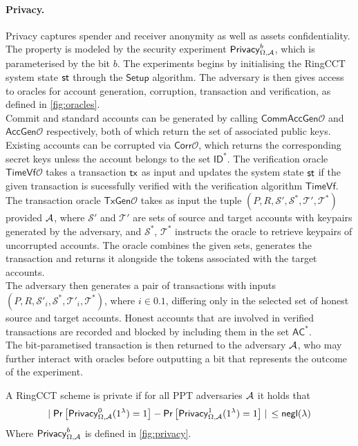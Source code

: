\paragraph*{Privacy.} Privacy captures spender and receiver anonymity as well as assets confidentiality. The property is modeled by the security experiment $\mathsf{Privacy}_{\Omega,\mathcal{A}}^b$, which is parameterised by the bit $b$. The experiments begins by initialising the RingCCT system state $\st$ through the $\mathsf{Setup}$ algorithm. The adversary is then gives access to oracles for account generation, corruption, transaction and verification, as defined in \cref{fig:oracles}. \\
Commit and standard accounts can be generated by calling $\mathsf{CommAccGen}\mathcal{O}$ and $\mathsf{AccGen}\mathcal{O}$ respectively, both of which return the set of associated public keys. Existing accounts can be corrupted via $\mathsf{Corr}\mathcal{O}$, which returns the corresponding secret keys unless the account belongs to the set $\mathsf{ID}^*$. The verification oracle $\mathsf{TimeVf}\mathcal{O}$ takes a transaction $\mathsf{tx}$ as input and updates the system state $\st$ if the given transaction is sucessfully verified with the verification algorithm $\mathsf{TimeVf}$. \\
The transaction oracle $\mathsf{TxGen}\mathcal{O}$ takes as input the tuple $(P, R, \mathcal{S}', \mathcal{S}^*, \mathcal{T}', \mathcal{T}^*)$ provided $\mathcal{A}$, where $\mathcal{S}'$ and $\mathcal{T}'$ are sets of source and target accounts with keypairs generated by the adversary, and $\mathcal{S}^*$, $\mathcal{T}^*$ instructs the oracle to retrieve keypairs of uncorrupted accounts. The oracle combines the given sets, generates the transaction and returns it alongside the tokens associated with the target accounts. \\ 
The adversary then generates a pair of transactions with inputs $(P, R, \mathcal{S}'_i, \mathcal{S}^*, \mathcal{T}'_i, \mathcal{T}^*)$, where $i \in {0.1}$, differing only in the selected set of honest source and target accounts. Honest accounts that are involved in verified transactions are recorded and blocked by including them in the set $\mathsf{AC}^*$. \\
The bit-parametised transaction is then returned to the adversary $\mathcal{A}$, who may further interact with oracles before outputting a bit that represents the outcome of the experiment.

\begin{definition}[Privacy] A RingCCT scheme is private if for all PPT adversaries $\mathcal{A}$ it holds that
\begin{equation*}
\mid \mathsf{Pr}\left[\mathsf{Privacy}_{\Omega,\adv}^0(1^\lambda) = 1\right] -  \mathsf{Pr}\left[\mathsf{Privacy}_{\Omega,\adv}^1(1^\lambda) = 1\right] \mid \:\: \leq \negl
\end{equation*}
Where $\mathsf{Privacy}_{\Omega,\mathcal{A}}^b$ is defined in \cref{fig:privacy}. 
\end{definition}

